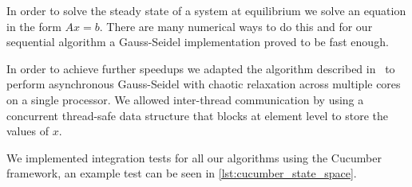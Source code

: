 
In order to solve the steady state of a system at equilibrium we solve an equation in the form $Ax = b$. There are many numerical ways to do this and for our sequential algorithm a Gauss-Seidel implementation proved to be fast enough.

In order to achieve further speedups we adapted the algorithm described in~\cite{dingle2002distributed} to perform asynchronous Gauss-Seidel with chaotic relaxation across multiple cores on a single processor. We allowed inter-thread communication by using a concurrent thread-safe data structure that blocks at element level to store the values of $x$.



We implemented integration tests for all our algorithms using the Cucumber framework, an example test can be seen in \cref{lst:cucumber_state_space}.